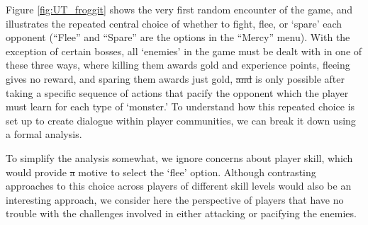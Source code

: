 \documentclass[arts,article,submit,moreauthors,pdftex,10pt,a4paper]{Definitions/mdpi}
\providecommand{\DIFadd}[1]{{\protect\color{blue}\uwave{#1}}} %
\providecommand{\DIFdel}[1]{{\protect\color{red}\sout{#1}}}                      %
\providecommand{\DIFaddbegin}{} %
\providecommand{\DIFaddend}{} %
\providecommand{\DIFdelbegin}{} %
\providecommand{\DIFdelend}{} %
\begin{document}
Figure \ref{fig:UT_froggit} shows the very first random encounter of the game, and illustrates the repeated central choice of whether to fight, flee, or `spare' each opponent (``Flee'' and ``Spare'' are the options in the ``Mercy'' menu).
%
With the exception of certain bosses, all `enemies' in the game must be dealt with in one of these three ways, where killing them awards gold and experience points, fleeing gives no reward, and sparing them awards just gold, \DIFdelbegin \DIFdel{and }\DIFdelend \DIFaddbegin \DIFadd{which }\DIFaddend is only possible after taking a specific sequence of actions that pacify the opponent which the player must learn for each type of `monster.'
%
To understand how this repeated choice is set up to create dialogue within player communities, we can break it down using a formal analysis.


To simplify the analysis somewhat, we ignore concerns about player skill, which would provide \DIFdelbegin \DIFdel{a }\DIFdelend \DIFaddbegin \DIFadd{an extra }\DIFaddend motive to select the `flee' option.
%
Although contrasting approaches to this choice across players of different skill levels would also be an interesting approach, we consider here the perspective of players that have no trouble with the challenges involved in either attacking or pacifying the enemies.
\end{document}
